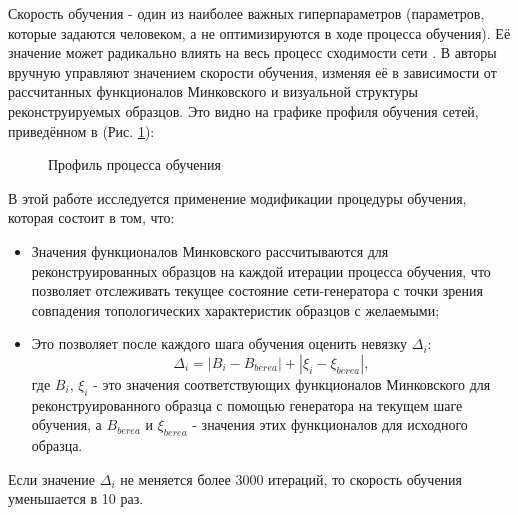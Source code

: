 			Скорость обучения - один из наиболее важных гиперпараметров (параметров, которые задаются человеком, а не оптимизируются в ходе процесса обучения). Её значение может радикально влиять на весь процесс сходимости сети \cite{Smith}. В \cite{Mosser} авторы вручную управляют значением скорости обучения, изменяя её в зависимости от рассчитанных функционалов Минковского и визуальной структуры реконструируемых образцов. Это видно на графике профиля обучения сетей, приведённом в \cite{Mosser} (Рис. \ref{2-berea-curve}):
			
			\begin{figure}[h!]
				\caption{Профиль процесса обучения \cite{Mosser}}
				\label{2-berea-curve}
			\end{figure}
		
			В этой работе исследуется применение модификации процедуры обучения, которая состоит в том, что:
			
			\begin{itemize}
				\item Значения функционалов Минковского рассчитываются для реконструированных образцов на каждой итерации процесса обучения, что позволяет отслеживать текущее состояние сети-генератора с точки зрения совпадения топологических характеристик образцов с желаемыми;
				\item Это позволяет после каждого шага обучения оценить невязку $\Delta_i$:
					\[ \Delta_i = |B_i - B_{berea}| + |\xi_i - \xi_{berea}|, \]
					где $B_i$, $\xi_i$ - это значения соответствующих функционалов Минковского для реконструированного образца с помощью генератора на текущем шаге обучения, а $B_{berea}$ и $\xi_{berea}$ - значения этих функционалов для исходного образца.
			\end{itemize}
			Если значение $\Delta_i$ не меняется более 3000 итераций, то скорость обучения уменьшается в 10 раз.